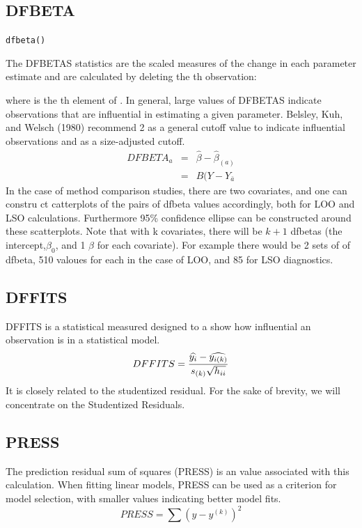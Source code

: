 \documentclass[Main.tex]{subfiles}
\begin{document}
	\subsection{DFBETA} %
		\texttt{dfbeta()}
		
		
		The DFBETAS statistics are the scaled measures of the change in each parameter estimate and are calculated by deleting the th observation:
		
		where  is the th element of .
		In general, large values of DFBETAS indicate observations that are influential in estimating a given parameter. Belsley, Kuh, and Welsch (1980) recommend 2 as a general cutoff value to indicate influential observations and  as a size-adjusted cutoff.
	\begin{eqnarray}
	DFBETA_{a} &=& \hat{\beta} - \hat{\beta}_{(a)} \\
	&=& B(Y-Y_{\bar{a}}
	\end{eqnarray}
	In the case of method comparison studies, there are two covariates, and one can constru
	ct catterplots of the pairs of dfbeta values accordingly, both for LOO and LSO calculations. Furthermore 95\% confidence ellipse can be constructed around these scatterplots.
	Note that with k covariates, there will be $k+1$ dfbetas (the intercept,$\beta_0$, and 1 $\beta$ for each covariate). For example there would be 2 sets of of dfbeta, 510 valoues for each in the case of LOO, and 85 for LSO diagnostics.
	
	
	
	\subsection{DFFITS} %
	DFFITS is a statistical measured designed to a show how influential an observation is in a statistical model. 
	\begin{displaymath} DFFITS = {\widehat{y_i} -
		\widehat{y_{i(k)}} \over s_{(k)} \sqrt{h_{ii}}} \end{displaymath}
	It is closely related to the studentized residual. For the sake of brevity, we will concentrate on the Studentized Residuals.
	\subsection{PRESS} %
	The prediction residual sum of squares (PRESS) is an value associated with this calculation. When fitting linear models, PRESS can be used as a criterion for model selection, with smaller values indicating better model fits.
	\begin{equation}
	PRESS = \sum(y-y^{(k)})^2
	\end{equation}
	
\end{document}
